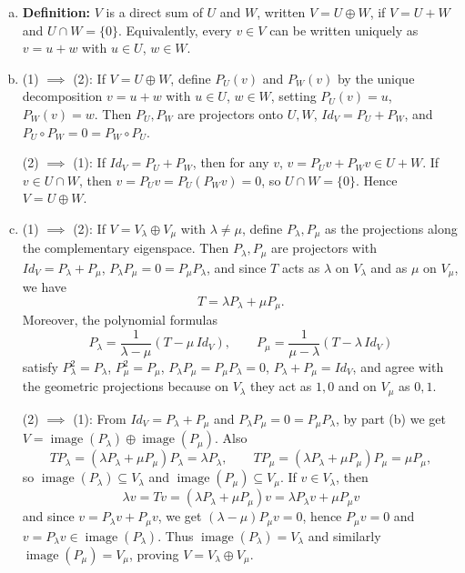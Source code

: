 \documentclass{article}
\begin{document}
\begin{enumerate}[(a)]
    \item \textbf{Definition:} $V$ is a direct sum of $U$ and $W$, written $V=U\oplus W$, if $V=U+W$ and $U\cap W=\{0\}$. Equivalently, every $v\in V$ can be written uniquely as $v=u+w$ with $u\in U$, $w\in W$.
    \item (1) $\implies$ (2): If $V=U\oplus W$, define $P_U(v)$ and $P_W(v)$ by the unique decomposition $v=u+w$ with $u\in U$, $w\in W$, setting $P_U(v)=u$, $P_W(v)=w$. Then $P_U,P_W$ are projectors onto $U,W$, $Id_V=P_U+P_W$, and $P_U\circ P_W=0=P_W\circ P_U$.

    (2) $\implies$ (1): If $Id_V=P_U+P_W$, then for any $v$, $v=P_Uv+P_Wv\in U+W$. If $v\in U\cap W$, then $v=P_Uv=P_U(P_Wv)=0$, so $U\cap W=\{0\}$. Hence $V=U\oplus W$.
    \item (1) $\implies$ (2): If $V=V_\lambda\oplus V_\mu$ with $\lambda\neq\mu$, define $P_\lambda, P_\mu$ as the projections along the complementary eigenspace. Then $P_\lambda,P_\mu$ are projectors with $Id_V=P_\lambda+P_\mu$, $P_\lambda P_\mu=0=P_\mu P_\lambda$, and since $T$ acts as $\lambda$ on $V_\lambda$ and as $\mu$ on $V_\mu$, we have
    \[T=\lambda P_\lambda+\mu P_\mu.\]
    Moreover, the polynomial formulas
    \[
    P_\lambda=\frac{1}{\lambda-\mu}(T-\mu\,Id_V),\qquad
    P_\mu=\frac{1}{\mu-\lambda}(T-\lambda\,Id_V)
    \]
    satisfy $P_\lambda^2=P_\lambda$, $P_\mu^2=P_\mu$, $P_\lambda P_\mu=P_\mu P_\lambda=0$, $P_\lambda+P_\mu=Id_V$, and agree with the geometric projections because on $V_\lambda$ they act as $1,0$ and on $V_\mu$ as $0,1$.

    (2) $\implies$ (1): From $Id_V=P_\lambda+P_\mu$ and $P_\lambda P_\mu=0=P_\mu P_\lambda$, by part (b) we get $V=\operatorname{image}(P_\lambda)\oplus \operatorname{image}(P_\mu)$. Also
    \[
    T P_\lambda=(\lambda P_\lambda+\mu P_\mu)P_\lambda=\lambda P_\lambda,\qquad
    T P_\mu=(\lambda P_\lambda+\mu P_\mu)P_\mu=\mu P_\mu,
    \]
    so $\operatorname{image}(P_\lambda)\subseteq V_\lambda$ and $\operatorname{image}(P_\mu)\subseteq V_\mu$. If $v\in V_\lambda$, then
    \[
    \lambda v=T v=(\lambda P_\lambda+\mu P_\mu)v=\lambda P_\lambda v+\mu P_\mu v
    \]
    and since $v=P_\lambda v+P_\mu v$, we get $(\lambda-\mu)P_\mu v=0$, hence $P_\mu v=0$ and $v=P_\lambda v\in\operatorname{image}(P_\lambda)$. Thus $\operatorname{image}(P_\lambda)=V_\lambda$ and similarly $\operatorname{image}(P_\mu)=V_\mu$, proving $V=V_\lambda\oplus V_\mu$.
\end{enumerate}
\end{document}
